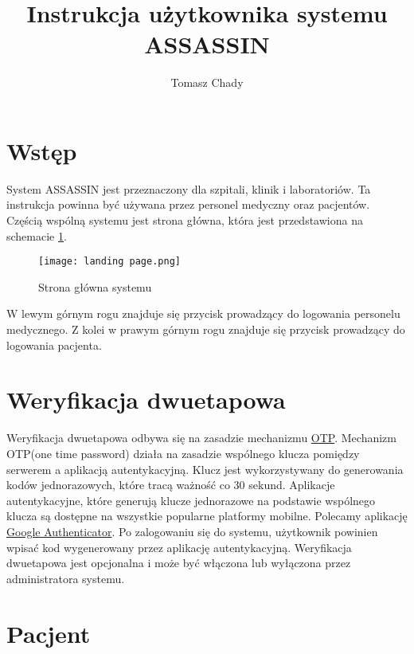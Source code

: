 \documentclass{documentation}
\title{Instrukcja użytkownika systemu ASSASSIN}
\author{Tomasz Chady}
\begin{document}
\maketitle

\tableofcontents

\HUGEskip

\section{Wstęp}

System ASSASSIN jest przeznaczony dla szpitali, klinik i laboratoriów.
Ta instrukcja powinna być używana przez personel medyczny oraz pacjentów.
Częścią wspólną systemu jest strona główna, która jest przedstawiona na schemacie \ref{fig:mainPage}.

\begin{figure}[h]
    \centering
    \texttt{[image: landing page.png]}
    \caption{Strona główna systemu\label{fig:mainPage}}
\end{figure}

W lewym górnym rogu znajduje się przycisk prowadzący do logowania personelu medycznego.
Z kolei w prawym górnym rogu znajduje się przycisk prowadzący do logowania pacjenta.

\section{Weryfikacja dwuetapowa}

Weryfikacja dwuetapowa odbywa się na zasadzie mechanizmu \href{https://pl.wikipedia.org/wiki/Has%C5%82o_jednorazowe}{OTP}.
Mechanizm OTP(one time password) działa na zasadzie wspólnego klucza pomiędzy serwerem a aplikacją autentykacyjną.
Klucz jest wykorzystywany do generowania kodów jednorazowych, które tracą ważność co 30 sekund.
Aplikacje autentykacyjne, które generują klucze jednorazowe na podstawie wspólnego klucza są dostępne na wszystkie popularne platformy mobilne.
Polecamy aplikację \href{https://play.google.com/store/apps/details?id=com.google.android.apps.authenticator2&hl=pl}{Google Authenticator}.
Po zalogowaniu się do systemu, użytkownik powinien wpisać kod wygenerowany przez aplikację autentykacyjną.
Weryfikacja dwuetapowa jest opcjonalna i może być włączona lub wyłączona przez administratora systemu.

\section{Pacjent}
\end{document}
